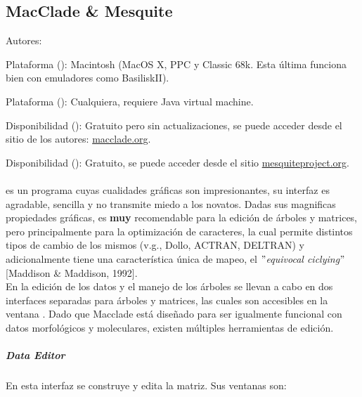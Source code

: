 \subsection{MacClade \& Mesquite}
\noindent
Autores: \cite{McClade4}

Plataforma (): Macintosh (MacOS X, PPC y Classic 68k. Esta \'ultima funciona bien con emuladores como BasiliskII).

Plataforma (): Cualquiera, requiere Java virtual machine.

Disponibilidad (): Gratuito pero sin actualizaciones, se puede acceder desde el sitio de los autores: \url{macclade.org}.


Disponibilidad (): Gratuito, se puede acceder desde el sitio \url{mesquiteproject.org}.

\paragraph*{}
 es un programa cuyas cualidades gr\'aficas son impresionantes, su interfaz es agradable, sencilla y no transmite miedo a los novatos. Dadas sus magnificas propiedades gr\'aficas, es \textbf{muy} recomendable para la edici\'on de \'arboles y matrices, pero principalmente para la optimizaci\'on de caracteres, la cual permite distintos tipos de cambio de los mismos (v.g., Dollo, ACTRAN, DELTRAN) y adicionalmente tiene una caracter\'istica \'unica de mapeo, el {{\textit{$"$equivocal ciclying$"$}}} [Maddison \& Maddison, 1992].\\

En  la edici\'on de los datos y el manejo de los \'arboles se llevan a cabo en dos interfaces separadas para \'arboles y matrices, las cuales son accesibles en la ventana . Dado que Macclade est\'a dise\~nado para ser igualmente funcional con datos morfol\'ogicos y moleculares,  existen m\'ultiples herramientas de edici\'on.

\subparagraph*{Data Editor}
En esta interfaz se construye y edita la matriz. Sus ventanas son:

